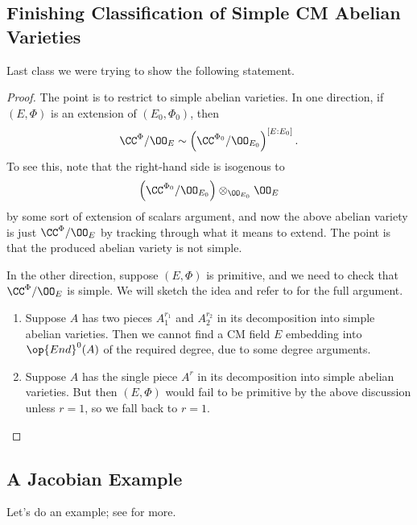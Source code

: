 \documentclass[../notes.tex]{subfiles}
\begin{document}
\subsection{Finishing Classification of Simple CM Abelian Varieties}
Last class we were trying to show the following statement.
\simplecmclassification*
\begin{proof}
	The point is to restrict  to simple abelian varieties. In one direction, if $(E,\Phi)$ is an extension of $(E_0,\Phi_0)$, then
	\[\CC^\Phi/\OO_E\sim\left(\CC^{\Phi_0}/\OO_{E_0}\right)^{[E:E_0]}.\]
	To see this, note that the right-hand side is isogenous to
	\[\left(\CC^{\Phi_0}/\OO_{E_0}\right)\otimes_{\OO_{E_0}}\OO_E\]
	by some sort of extension of scalars argument, and now the above abelian variety is just $\CC^\Phi/\OO_E$ by tracking through what it means to extend. The point is that the produced abelian variety is not simple.

	In the other direction, suppose $(E,\Phi)$ is primitive, and we need to check that $\CC^\Phi/\OO_E$ is simple. We will sketch the idea and refer to \cite[Proposition~3.6]{milne-cm} for the full argument.
	\begin{enumerate}
		\item Suppose $A$ has two pieces $A_1^{r_1}$ and $A_2^{r_2}$ in its decomposition into simple abelian varieties. Then we cannot find a CM field $E$ embedding into $\op{End}^0(A)$ of the required degree, due to some degree arguments.
		\item Suppose $A$ has the single piece $A^r$ in its decomposition into simple abelian varieties. But then $(E,\Phi)$ would fail to be primitive by the above discussion unless $r=1$, so we fall back to $r=1$.
		\qedhere
	\end{enumerate}
\end{proof}

\subsection{A Jacobian Example}
Let's do an example; see \cite[Section~1.7]{lang-cm} for more.
\end{document}
